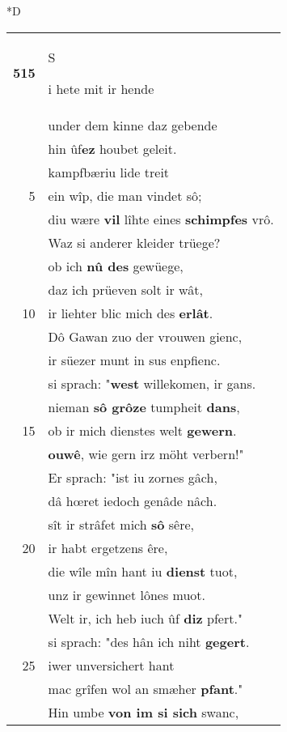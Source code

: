 \documentclass[8pt,a4paper,notitlepage]{article}
\begin{document}
\begin{table}[ht]
\begin{minipage}[t]{0.5\linewidth}
\small
\begin{center}*D
\end{center}
\begin{tabular}{rl}
\textbf{515} & \begin{large}S\end{large}i hete mit ir hende\\ 
 & under dem kinne daz gebende\\ 
 & hin ûf\textbf{ez} houbet geleit.\\ 
 & kampfbæriu lide treit\\ 
5 & ein wîp, die man vindet sô;\\ 
 & diu wære \textbf{vil} lîhte eines \textbf{schimpfes} vrô.\\ 
 & Waz si anderer kleider trüege?\\ 
 & ob ich \textbf{nû des} gewüege,\\ 
 & daz ich prüeven solt ir wât,\\ 
10 & ir liehter blic mich des \textbf{erlât}.\\ 
 & Dô Gawan zuo der vrouwen gienc,\\ 
 & ir süezer munt in sus enpfienc.\\ 
 & si sprach: "\textbf{west} willekomen, ir gans.\\ 
 & nieman \textbf{sô grôze} tumpheit \textbf{dans},\\ 
15 & ob ir mich dienstes welt \textbf{gewern}.\\ 
 & \textbf{ouwê}, wie gern irz möht verbern!"\\ 
 & Er sprach: "ist iu zornes gâch,\\ 
 & dâ hœret iedoch genâde nâch.\\ 
 & sît ir strâfet mich \textbf{sô} sêre,\\ 
20 & ir habt ergetzens êre,\\ 
 & die wîle mîn hant iu \textbf{dienst} tuot,\\ 
 & unz ir gewinnet lônes muot.\\ 
 & Welt ir, ich heb iuch ûf \textbf{diz} pfert."\\ 
 & si sprach: "des hân ich niht \textbf{gegert}.\\ 
25 & iwer unversichert hant\\ 
 & mac grîfen wol an smæher \textbf{pfant}."\\ 
 & Hin umbe \textbf{von im si sich} swanc,\\ 

\end{tabular}
\end{minipage}
\end{table}
\end{document}
